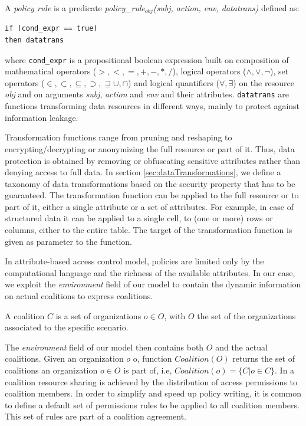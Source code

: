 \begin{definition}
A {\it policy rule} is a predicate {\it policy\_rule$_{obj}$(subj, action, env, datatrans)} defined as:
\begin{verbatim}
if (cond_expr == true)
then datatrans
\end{verbatim}
where {\tt cond\_expr} is a propositional boolean expression built on composition of mathematical operators ($>,<, =, +, -, *, /$), logical operators ($\land,\lor,\neg$), set operators ($\in,\subset,\subseteq,\supset, \supseteq \cup,\cap$) and logical quantifiers ($\forall, \exists$) on the resource \textit{obj} and on arguments \textit{subj}, \textit{action} and \textit{env} and their attributes. \texttt{datatrans} are functions transforming da\-ta resources in different ways, mainly to protect against information leakage. 
\end{definition}

Transformation functions range from pruning and reshaping to encrypting/decrypting or anonymizing the full resource or part of it. Thus, data protection is obtained by removing or obfuscating sensitive attributes rather than denying access to full data. In section \ref{sec:dataTransformations}, we define a taxonomy of data transformations based on the security property that has to be guaranteed.
The transformation function can be applied to the full resource or to part of it, either a single attribute or a set of attributes. For example, in case of structured data it can be applied to a single cell, to (one or more) rows or columns, either to the entire table. The target of the transformation function is given as parameter to the function.

In attribute-based access control model, policies are limited only by the computational language and the richness of the available attributes. In our case, we exploit the {\it environment} field of our model to contain the dynamic information on actual coalitions to express coalitions.

\begin{definition}[Coalition]
A coalition $C$ is a set of organizations $o\in O$, with $O$ the set of the organizations associated to the specific scenario.
\end{definition}
The {\it environment} field of our model then contains both $O$ and the actual coalitions. Given an organization $o$ o, function $\textit{Coalition}(O)$ returns the set of coalitions an organization $o\in O$ is part of, i.e, $\textit{Coalition}(o)=\{ C | o \in C\}$. In a coalition resource sharing is achieved by the distribution of access permissions to coalition members. In order to simplify and speed up policy writing, it is common to define a default set of permissions rules to be applied to all coalition members. This set of rules are part of a coalition agreement.

